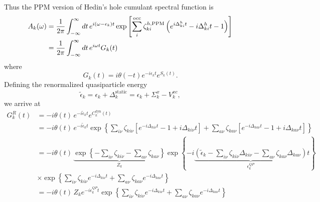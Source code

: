 Thus the PPM version of Hedin's hole cumulant spectral function is
\begin{align}
    A_k(\omega)
    &=
    \frac{1}{2\pi}
    \int_{-\infty}^{\infty} dt\,
    e^{i(\omega-\epsilon_k)t}
    \exp
    \left[
    \sum_i^{\rm occ}
    \zeta_{ki}^{h,{\rm PPM}}
    \left(
    e^{i\Delta_{ki}^{h}t}
    -i\Delta_{ki}^{h}t
    -1
    \right)
    \right]\\
    &=
    \frac{1}{2\pi}
    \int_{-\infty}^{\infty} dt\,
    e^{i\omega t} G_k(t)
\end{align}
where
\begin{equation}
    G_k(t)
    =
    i\theta(-t)
    e^{-i\epsilon_k t}
    e^{S_k(t)}.
\end{equation}
Defining the renormalized quasiparticle energy
\begin{equation}
\tilde{\epsilon}_k = \epsilon_k + \Delta_k^{\text{static}}
= \epsilon_k + \Sigma_k^{x} - V_k^{xc},
\end{equation}
we arrive at
\begin{align}
G_k^R(t) &= -i\theta(t)\, e^{-i \tilde{\epsilon}_k t} e^{C_k^{\text{dyn}}(t)} \\
&= -i\theta(t)\, e^{-i \tilde{\epsilon}_k t} \exp\left\{\sum_{i\nu} \zeta_{ki\nu} \left[ e^{-i\Delta_{ki\nu} t} - 1 + i\Delta_{ki\nu} t \right] + \sum_{a\nu} \zeta_{ka\nu} \left[ e^{-i\Delta_{ka\nu} t} - 1 + i\Delta_{ka\nu} t \right]\right\}\\
&= -i\theta(t)\, \underbrace{\exp\left\{-\sum_{i\nu} \zeta_{ki\nu} - \sum_{a\nu} \zeta_{ka\nu} \right\}}_{Z_k} \exp\left\{-i \underbrace{\left(\tilde{\epsilon}_k - \sum_{i\nu} \zeta_{ki\nu} \Delta_{ki\nu} - \sum_{a\nu} \zeta_{ka\nu} \Delta_{ka\nu}\right)}_{\epsilon_k^{QP}} t\right\}\\
&\times \exp\left\{\sum_{i\nu} \zeta_{ki\nu} e^{-i\Delta_{ki\nu} t} + \sum_{a\nu} \zeta_{ka\nu} e^{-i\Delta_{ka\nu} t}\right\} \\
&= -i\theta(t)\, Z_k e^{-i \epsilon_k^{QP} t} \exp\left\{\sum_{i\nu} \zeta_{ki\nu} e^{-i\Delta_{ki\nu} t} + \sum_{a\nu} \zeta_{ka\nu} e^{-i\Delta_{ka\nu} t}\right\}
\end{align}
